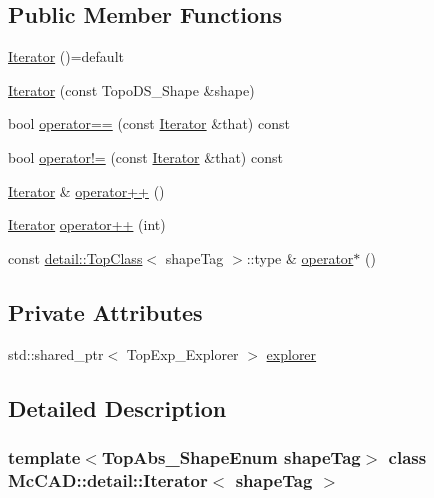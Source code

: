 \subsection*{Public Member Functions}
\begin{DoxyCompactItemize}
\item 
\hyperlink{classMcCAD_1_1detail_1_1Iterator_a7864eac2dca2a5901f7e220014eab96c}{Iterator} ()=default
\item 
\hyperlink{classMcCAD_1_1detail_1_1Iterator_ab1bd690b069222067c183bc010467f13}{Iterator} (const Topo\+D\+S\+\_\+\+Shape \&shape)
\item 
bool \hyperlink{classMcCAD_1_1detail_1_1Iterator_aa8c123d22356404064f03b2f148d7932}{operator==} (const \hyperlink{classMcCAD_1_1detail_1_1Iterator}{Iterator} \&that) const
\item 
bool \hyperlink{classMcCAD_1_1detail_1_1Iterator_ac12679f4148d74b4a812e8cc3f260ada}{operator!=} (const \hyperlink{classMcCAD_1_1detail_1_1Iterator}{Iterator} \&that) const
\item 
\hyperlink{classMcCAD_1_1detail_1_1Iterator}{Iterator} \& \hyperlink{classMcCAD_1_1detail_1_1Iterator_ae8af9de0efeb7fa97b6c37686909f0f3}{operator++} ()
\item 
\hyperlink{classMcCAD_1_1detail_1_1Iterator}{Iterator} \hyperlink{classMcCAD_1_1detail_1_1Iterator_a54d5d98592dcf959c5acaeb30c5f37ac}{operator++} (int)
\item 
const \hyperlink{structMcCAD_1_1detail_1_1TopClass}{detail\+::\+Top\+Class}$<$ shape\+Tag $>$\+::type \& \hyperlink{classMcCAD_1_1detail_1_1Iterator_af292a9686a6fe67635de0cea6b807f7f}{operator$\ast$} ()
\end{DoxyCompactItemize}
\subsection*{Private Attributes}
\begin{DoxyCompactItemize}
\item 
std\+::shared\+\_\+ptr$<$ Top\+Exp\+\_\+\+Explorer $>$ \hyperlink{classMcCAD_1_1detail_1_1Iterator_a49cc02fa92619690477efd1334df03c1}{explorer}
\end{DoxyCompactItemize}


\subsection{Detailed Description}
\subsubsection*{template$<$Top\+Abs\+\_\+\+Shape\+Enum shape\+Tag$>$\newline
class Mc\+C\+A\+D\+::detail\+::\+Iterator$<$ shape\+Tag $>$}



